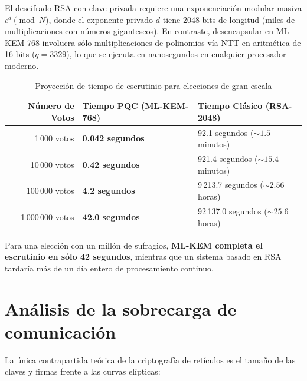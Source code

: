 \documentclass[11pt,a4paper,twoside,openright]{book}
\theoremstyle{plain}
\theoremstyle{definition}
\theoremstyle{remark}
\newcommand{\MLKEM}{\textsf{ML-KEM}}
\begin{document}
\begin{intuicion}
El descifrado RSA con clave privada requiere una exponenciaci\'on modular masiva $c^d \pmod N$, donde el exponente privado $d$ tiene 2048 bits de longitud (miles de multiplicaciones con n\'umeros gigantescos).
En contraste, desencapsular en \MLKEM{}-768 involucra s\'olo multiplicaciones de polinomios v\'ia NTT en aritm\'etica de 16 bits ($q=3329$), lo que se ejecuta en nanosegundos en cualquier procesador moderno.
\end{intuicion}

\begin{table}[H]
\centering
\caption{Proyecci\'on de tiempo de escrutinio para elecciones de gran escala}
\label{tab:proyeccion_tally}
\begin{tabular}{rll}
\toprule
\textbf{N\'umero de Votos} & \textbf{Tiempo PQC (ML-KEM-768)} & \textbf{Tiempo Cl\'asico (RSA-2048)} \\
\midrule
1\,000 votos & \textbf{0.042 segundos} & 92.1 segundos ($\sim 1.5$ minutos) \\
10\,000 votos & \textbf{0.42 segundos} & 921.4 segundos ($\sim 15.4$ minutos) \\
100\,000 votos & \textbf{4.2 segundos} & 9\,213.7 segundos ($\sim 2.56$ horas) \\
1\,000\,000 votos & \textbf{42.0 segundos} & 92\,137.0 segundos ($\sim 25.6$ horas) \\
\bottomrule
\end{tabular}
\end{table}

Para una elecci\'on con un mill\'on de sufragios, \textbf{\MLKEM{} completa el escrutinio en s\'olo 42 segundos}, mientras que un sistema basado en RSA tardar\'ia m\'as de un d\'ia entero de procesamiento continuo.

\section{An\'alisis de la sobrecarga de comunicaci\'on}

La \'unica contrapartida te\'orica de la criptograf\'ia de ret\'iculos es el tama\~no de las claves y firmas frente a las curvas el\'ipticas:
\end{document}
